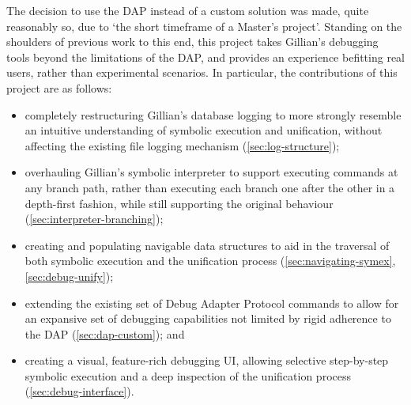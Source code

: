 The decision to use the DAP instead of a custom solution was made, quite
reasonably so, due to `the short timeframe of a Master's project'. Standing on
the shoulders of previous work to this end, this project takes Gillian's
debugging tools beyond the limitations of the DAP, and provides an experience
befitting real users, rather than experimental scenarios. In particular, the
contributions of this project are as follows:
\begin{itemize}
  \item completely restructuring Gillian's database logging to more strongly
        resemble an intuitive understanding of symbolic execution and
        unification, without affecting the existing file logging mechanism
        (\autoref{sec:log-structure});
  \item overhauling Gillian's symbolic interpreter to support executing commands
        at any branch path, rather than executing each branch one after the
        other in a depth-first fashion, while still supporting the original
        behaviour (\autoref{sec:interpreter-branching});
  \item creating and populating navigable data structures to aid in the
        traversal of both symbolic execution and the unification process
        (\autoref{sec:navigating-symex}, \autoref{sec:debug-unify});
  \item extending the existing set of Debug Adapter Protocol commands to allow
        for an expansive set of debugging capabilities not limited by rigid
        adherence to the DAP (\autoref{sec:dap-custom}); and
  \item creating a visual, feature-rich debugging UI, allowing selective
        step-by-step symbolic execution and a deep inspection of the unification
        process (\autoref{sec:debug-interface}).
\end{itemize}
